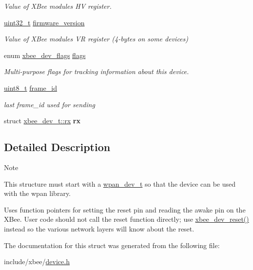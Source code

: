 \begin{DoxyCompactItemize}
\begin{DoxyCompactList}\small\item\em Value of X\+Bee module\textquotesingle{}s HV register. \end{DoxyCompactList}\item 
\hyperlink{group__hal__dos_ga09a1e304d66d35dd47daffee9731edaa}{uint32\+\_\+t} \hyperlink{group__xbee__device_gac8e0f35fdeff288dd1a7b4f49754c9b2}{firmware\+\_\+version}
\begin{DoxyCompactList}\small\item\em Value of X\+Bee module\textquotesingle{}s VR register (4-\/bytes on some devices) \end{DoxyCompactList}\item 
enum \hyperlink{group__xbee__device_ga80478d6b87ebdf34b5ec06e5ca6f309e}{xbee\+\_\+dev\+\_\+flags} \hyperlink{group__xbee__device_ga9ac684521a8154bddc272049a7a61b73}{flags}
\begin{DoxyCompactList}\small\item\em Multi-\/purpose flags for tracking information about this device. \end{DoxyCompactList}\item 
\hyperlink{group__hal__dos_gae1affc9ca37cfb624959c866a73f83c2}{uint8\+\_\+t} \hyperlink{group__xbee__device_ga03c1016ac46b9df250b994f242cf956a}{frame\+\_\+id}
\begin{DoxyCompactList}\small\item\em last frame\+\_\+id used for sending \end{DoxyCompactList}\item 
struct \hyperlink{structxbee__dev__t_1_1rx}{xbee\+\_\+dev\+\_\+t\+::rx} {\bfseries rx}
\end{DoxyCompactItemize}


\subsection{Detailed Description}
\begin{DoxyNote}{Note}

\begin{DoxyItemize}
\item This structure must start with a \hyperlink{structwpan__dev__t}{wpan\+\_\+dev\+\_\+t} so that the device can be used with the wpan library.
\item Uses function pointers for setting the reset pin and reading the awake pin on the X\+Bee. User code should not call the reset function directly; use \hyperlink{group__xbee__device_gad312efa700cca7ca044cddf364cc51f5}{xbee\+\_\+dev\+\_\+reset()} instead so the various network layers will know about the reset. 
\end{DoxyItemize}
\end{DoxyNote}


The documentation for this struct was generated from the following file\+:\begin{DoxyCompactItemize}
\item 
include/xbee/\hyperlink{device_8h}{device.\+h}\end{DoxyCompactItemize}
